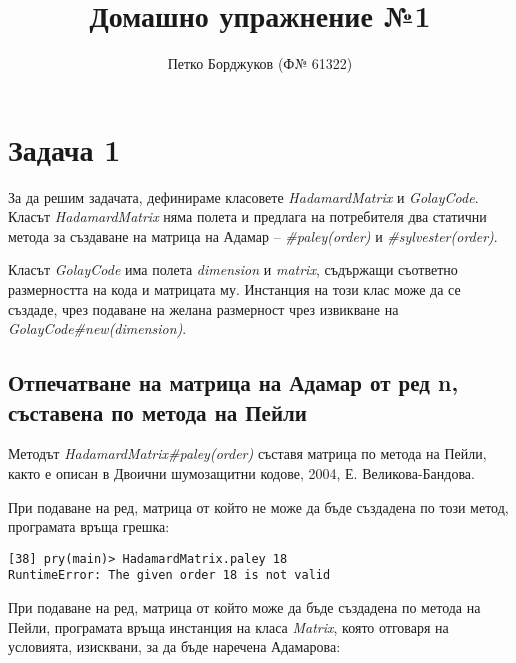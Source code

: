 \documentclass[a4paper,notitlepage,oneside]{report}
\title{Домашно упражнение №1}
\author{Петко Борджуков (Ф№ 61322)}
\date{}
\begin{document}
\maketitle
\setcounter{secnumdepth}{0}
\section{Задача 1}

За да решим задачата, дефинираме класовете \emph{HadamardMatrix} и
\emph{GolayCode}. Класът \emph{HadamardMatrix} няма полета и предлага на
потребителя два статични метода за създаване на матрица на Адамар --
\emph{\#paley(order)} и \emph{\#sylvester(order)}.

Класът \emph{GolayCode} има полета \emph{dimension} и \emph{matrix}, съдържащи
съответно размерността на кода и матрицата му. Инстанция на този клас може да се
създаде, чрез подаване на желана размерност чрез извикване на
\emph{GolayCode\#new(dimension)}.

\subsection{Отпечатване на матрица на Адамар от ред n, съставена по метода на
  Пейли}
Методът \emph{HadamardMatrix\#paley(order)} съставя матрица по метода на Пейли,
както е описан в Двоични шумозащитни кодове, 2004, Е. Великова-Бандова.

При подаване на ред, матрица от който не може да бъде създадена по този метод,
програмата връща грешка:
\begin{lstlisting}
[38] pry(main)> HadamardMatrix.paley 18
RuntimeError: The given order 18 is not valid
\end{lstlisting}

При подаване на ред, матрица от който може да бъде създадена по метода на Пейли,
програмата връща инстанция на класа \emph{Matrix}, която отговаря на условията,
изисквани, за да бъде наречена Адамарова:
\end{document}
